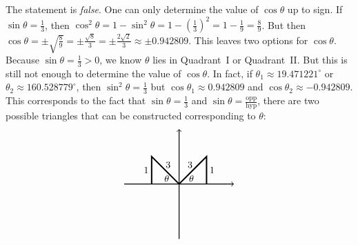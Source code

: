 \documentclass[11pt,letterpaper]{article}
\begin{document}
\sol The statement is \textit{false}. One can only determine the value of $\cos \theta$ up to sign. If $\sin \theta= \frac{1}{3}$, then $\cos^2 \theta= 1 - \sin^2 \theta= 1 - \left( \frac{1}{3} \right)^2= 1 - \frac{1}{9}= \frac{8}{9}$. But then $\cos \theta= \pm \sqrt{\frac{8}{9}}= \pm \frac{\sqrt{8}}{3}= \pm \frac{2 \sqrt{2}}{3} \approx \pm 0.942809$. This leaves two options for $\cos \theta$. Because $\sin \theta= \frac{1}{3} > 0$, we know $\theta$ lies in Quadrant~I or Quadrant~II. But this is still not enough to determine the value of $\cos \theta$. In fact, if $\theta_1 \approx 19.471221^\circ$ or $\theta_2 \approx 160.528779^\circ$, then $\sin^2 \theta= \frac{1}{3}$ but $\cos \theta_1 \approx 0.942809$ and $\cos \theta_2 \approx -0.942809$. This corresponds to the fact that $\sin \theta= \frac{1}{3}$ and $\sin \theta= \frac{\text{opp}}{\text{hyp}}$, there are two possible triangles that can be constructed corresponding to $\theta$:
	\[
	\begin{tikzpicture}
	\draw[line width=0.03cm,->] (0,-2) -- (0,2);
	\draw[line width=0.03cm,->] (-2,0) -- (2,0);
	\draw[line width=0.05cm] (0,0) -- (1,1) -- (1,0);
	\draw[line width=0.05cm] (0,0) -- (-1,1) -- (-1,0);
	\node at (0.45,0.2) {$\theta$};
	\node at (-0.45,0.2) {$\theta$};
	\node at (1.2,0.5) {$1$};
	\node at (0.4,0.7) {$3$};
	\node at (-1.2,0.5) {$1$};
	\node at (-0.4,0.7) {$3$};
	\end{tikzpicture}
	\]
\end{document}
